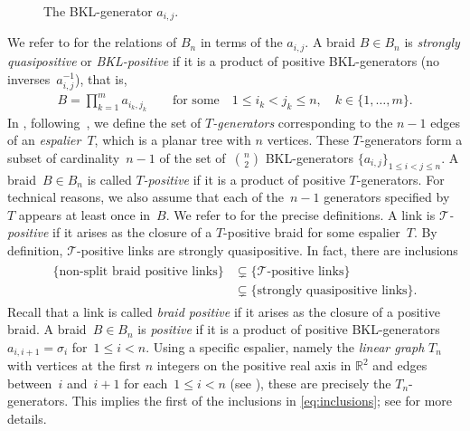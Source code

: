 \documentclass{amsart}
\theoremstyle{definition}
\theoremstyle{remark}
\theoremstyle{plain}
\newcommand{\R}{\mathbb{R}}
\newcommand{\sigij}{a_{i,j}}
\begin{document}
\begin{figure}[htbp] 
	 \centering
     \def\svgwidth{0,23\columnwidth}
	 
	\caption{The BKL-generator $\sigij$.}
	\label{fig:sqpbraidgen}
\end{figure}

We refer to  for the relations of $B_n$ in terms of the $a_{i,j}$.
A braid $B \in B_n$ is \emph{strongly quasipositive} or \emph{BKL-positive} if it is a product of positive BKL-generators (no inverses~$a_{i,j}^{-1}$), that is,
\begin{align*}
    B = \prod_{k=1}^m a_{i_k,j_k} \qquad \text{for some} \quad 1 \leq i_k < j_k \leq n, \quad k\in \{1,\dots,m\}.
\end{align*}
In , following~\cite{Rudolph_Hopf_plumbing}, we define the set of \emph{$T$-generators} corresponding to the $n-1$ edges of an \emph{espalier}~$T$, which is a planar tree with $n$ vertices. These $T$-generators form a subset of cardinality~$n-1$ of the set of~$\binom{n}{2}$ BKL-generators $\{a_{i,j}\}_{1 \leq i < j \leq n}$. A braid~$B \in B_n$ is called \emph{$T$-positive} if it is a product of positive $T$-generators. For technical reasons, we also assume that each of the~$n-1$ generators specified by~$T$ appears at least once in~$B$. We refer to  for the precise definitions. A link is \emph{$\mathcal{T}$-positive} if it arises as the closure of a $T$-positive braid for some espalier~$T$. By definition, $\mathcal{T}$-positive links are strongly quasipositive. In fact, there are inclusions
\begin{align}\label{eq:inclusions}
    \begin{split}
        \{\text{non-split braid positive links}\} &\subsetneq \{\text{$\mathcal{T}$-positive links}\} \\&\subsetneq \{\text{strongly quasipositive links}\}.
    \end{split}
\end{align}
Recall that a link is called \emph{braid positive} if it arises as the closure of a positive braid. A braid~$B \in B_n$ is \emph{positive} if it is a product of positive BKL-generators $a_{i,i+1}=\sigma_i$ for~$1 \leq i < n$. Using a specific espalier, namely the \emph{linear graph} $T_n$ with vertices at the first $n$ integers on the positive real axis in $\R^2$ and edges between~$i$ and~$i+1$ for each~$1 \leq i < n$ (see ), these are precisely the $T_n$-generators. This implies the first of the inclusions in \eqref{eq:inclusions}; see  for more details. %
\end{document}
